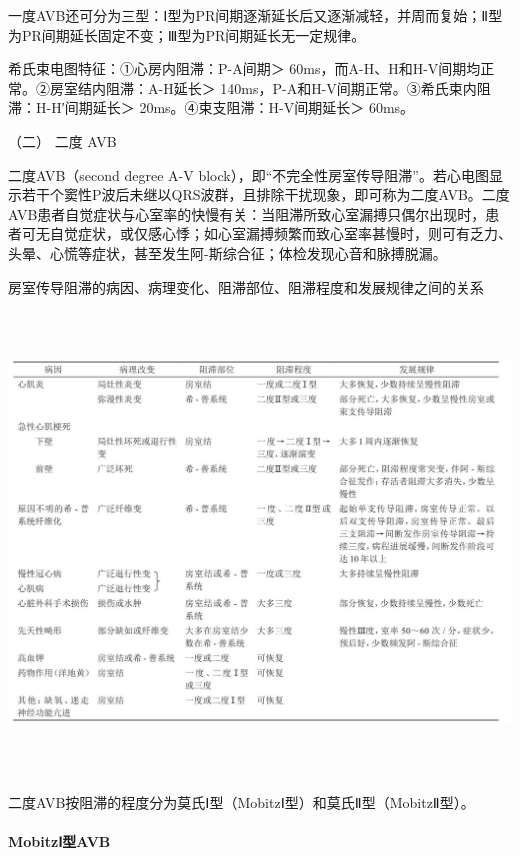 一度AVB还可分为三型：Ⅰ型为PR间期逐渐延长后又逐渐减轻，并周而复始；Ⅱ型为PR间期延长固定不变；Ⅲ型为PR间期延长无一定规律。

希氏束电图特征：①心房内阻滞：P-A间期＞
60ms，而A-H、H和H-V间期均正常。②房室结内阻滞：A-H延长＞
140ms，P-A和H-V间期正常。③希氏束内阻滞：H-H′间期延长＞
20ms。④束支阻滞：H-V间期延长＞ 60ms。

\hypertarget{text00297.htmlux5cux23CHP10-2-10-2-2-2}{}
（二） 二度 AVB

二度AVB（second degree A-V
block），即“不完全性房室传导阻滞”。若心电图显示若干个窦性P波后未继以QRS波群，且排除干扰现象，即可称为二度AVB。二度AVB患者自觉症状与心室率的快慢有关：当阻滞所致心室漏搏只偶尔出现时，患者可无自觉症状，或仅感心悸；如心室漏搏频繁而致心室率甚慢时，则可有乏力、头晕、心慌等症状，甚至发生阿-斯综合征；体检发现心音和脉搏脱漏。

\begin{table}[htbp]
\centering
\caption{房室传导阻滞的病因、病理变化、阻滞部位、阻滞程度和发展规律之间的关系}
\label{tab102-18}
\includegraphics[width=6.69792in,height=4.82292in]{./images/Image00459.jpg}
\end{table}

二度AVB按阻滞的程度分为莫氏Ⅰ型（MobitzⅠ型）和莫氏Ⅱ型（MobitzⅡ型）。

\paragraph{MobitzⅠ型AVB}

